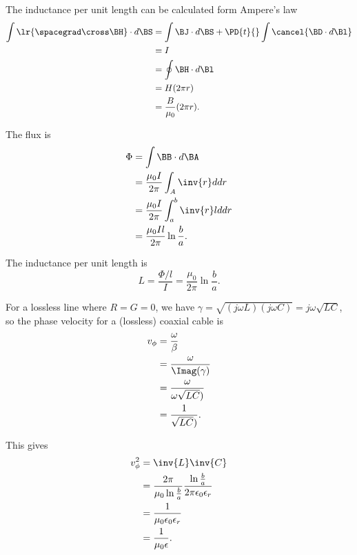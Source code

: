{%
The inductance per unit length can be calculated form Ampere's law
\begin{equation}\label{eqn:uwaves4TransmissionLines:380}
\begin{aligned}
\int \lr{ \spacegrad \cross \BH } \cdot d\BS
&=
\int \BJ \cdot d\BS + \PD{t}{} \int \cancel{\BD \cdot d\Bl}
\\ &=
I
\\ &=
\oint \BH \cdot d\Bl
\\ &=
H ( 2 \pi r )
\\ &=
\frac{B}{\mu_0} ( 2 \pi r ).
\end{aligned}
\end{equation}

The flux is
\begin{equation}\label{eqn:uwaves4TransmissionLines:400}
\begin{aligned}
\Phi
&= \int \BB \cdot d\BA
\\ &= \frac{\mu_0 I}{ 2 \pi } \int_A \inv{r} d dr
\\ &= \frac{\mu_0 I}{ 2 \pi } \int_a^b \inv{r} l d dr
\\ &= \frac{\mu_0 I l}{ 2 \pi } \ln \frac{b}{a}.
\end{aligned}
\end{equation}

The inductance per unit length is
\begin{equation}\label{eqn:uwaves4TransmissionLines:420}
L = \frac{\Phi/l}{I} = \frac{\mu_0}{ 2 \pi } \ln \frac{b}{a}.
\end{equation}


For a lossless line where \( R = G = 0 \), we have \( \gamma = \sqrt{ (j \omega L)(j \omega C)} = j \omega \sqrt{L C} \),
so the phase velocity for a (lossless) coaxial cable is
\begin{equation}\label{eqn:uwaves4TransmissionLines:440}
\begin{aligned}
v_\phi
&= \frac{\omega}{\beta}
\\ &= \frac{\omega}{\Imag(\gamma)}
\\ &= \frac{\omega}{\omega \sqrt{LC})}
\\ &= \frac{1}{\sqrt{LC})}.
\end{aligned}
\end{equation}

This gives
\begin{equation}\label{eqn:uwaves4TransmissionLines:460}
\begin{aligned}
v_\phi^2
&= \inv{ L }  \inv{C}
\\ &=
\frac{ 2 \pi }{ \mu_0 \ln \frac{b}{a} }
\frac
{\ln \frac{b}{a}}
{2 \pi \epsilon_0 \epsilon_r }
\\ &=
\frac{1 }{ \mu_0 \epsilon_0 \epsilon_r }
\\ &=
\frac{1 }{ \mu_0 \epsilon }.
\end{aligned}
\end{equation}

}
